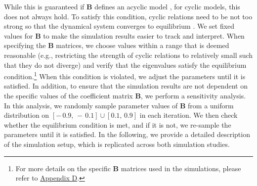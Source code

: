 \documentclass[twoside, 11pt]{article}
\begin{document}
While this is guaranteed if $\mathbf{B}$ defines an acyclic model \citep{drton_structure_2017}, for cyclic models, this does not always hold. To satisfy this condition, cyclic relations need to be not too strong so that the dynamical system converges to equilibrium \citep{rothenhausler_backshift_2015}. We set fixed values for $\mathbf{B}$ to make the simulation results easier to track and interpret. When specifying the $\mathbf{B}$ matrices, we choose values within a range that is deemed reasonable (e.g., restricting the strength of cyclic relations to relatively small such that they do not diverge) and verify that the eigenvalues satisfy the equilibrium condition.\footnote{For more details on the specific $\mathbf{B}$ matrices used in the simulations, please refer to \hyperref[Bmatrix]{Appendix D}.} When this condition is violated, we adjust the parameters until it is satisfied. In addition, to ensure that the simulation results are not dependent on the specific values of the coefficient matrix $\mathbf{B}$, we perform a sensitivity analysis. In this analysis, we randomly sample parameter values of $\mathbf{B}$ from a uniform distribution on $[-\,0.9,\, -\,0.1] \cup [0.1, \, 0.9]$ in each iteration. We then check whether the equilibrium condition is met, and if it is not, we re-sample the parameters until it is satisfied.
In the following, we provide a detailed description of the simulation setup, which is replicated across both simulation studies.


\end{document}
